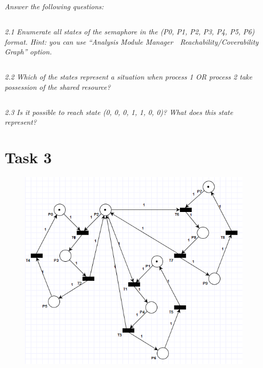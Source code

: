 \documentclass[letterpaper]{article}
\begin{document}
\textit{Answer the following questions:}

\subsection{}
\textit{2.1  Enumerate all states of the semaphore in the (P0, P1, P2, P3, P4, P5, P6) format.
 Hint: you can use “Analysis Module Manager  Reachability/Coverability Graph” option.
}

\subsection{}
\textit{2.2  Which of the states represent a situation when process 1 OR process 2 take possession of the shared resource?}

\subsection{}
\textit{2.3  Is it possible to reach state (0, 0, 0, 1, 1, 0, 0)? What does this state represent?}

\section{Task 3}

\begin{figure}[H]
 \centering
 \includegraphics[width=\textwidth]{image4.png}
\end{figure}
\end{document}
